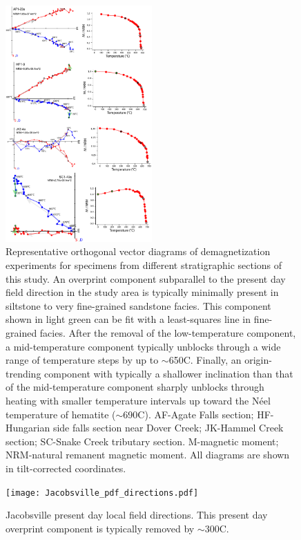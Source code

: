 \documentclass[11pt,letterpaper]{article}
\begin{document}
\begin{figure}[h!]
\centering
\includegraphics[width=0.5\textwidth]{Manuscript/SI_orthogonal.pdf}
\caption{Representative orthogonal vector diagrams of demagnetization experiments for specimens from different stratigraphic sections of this study. An overprint component subparallel to the present day field direction in the study area is typically minimally present in siltstone to very fine-grained sandstone facies. This component shown in light green can be fit with a least-squares line in fine-grained facies. After the removal of the low-temperature component, a mid-temperature component typically unblocks through a wide range of temperature steps by up to $\sim$650\textdegree C. Finally, an origin-trending component with typically a shallower inclination than that of the mid-temperature component sharply unblocks through heating with smaller temperature intervals up toward the N\'eel temperature of hematite ($\sim$690\textdegree C). AF-Agate Falls section; HF-Hungarian side falls section near Dover Creek; JK-Hammel Creek section; SC-Snake Creek tributary section. M-magnetic moment; NRM-natural remanent magnetic moment. All diagrams are shown in tilt-corrected coordinates.}
\label{fig:SI_orthogonal}
\end{figure}

\begin{figure}[h!]
\centering
\texttt{[image: Jacobsville\_pdf\_directions.pdf]}
\caption{Jacobsville present day local field directions. This present day overprint component is typically removed by $\sim$300\textdegree C.}
\label{fig:Jacobsville_pdf}
\end{figure}
\end{document}
